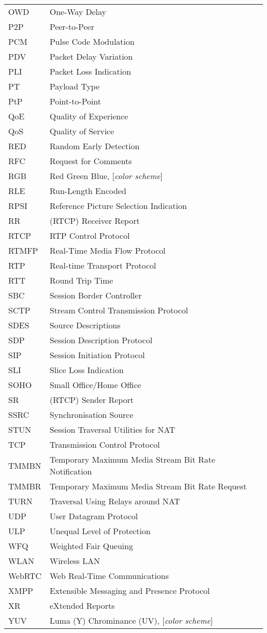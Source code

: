 \begin{longtable}{ll}
OWD 	& One-Way Delay \\
P2P 	& Peer-to-Peer \\
PCM 	& Pulse Code Modulation \\
PDV  	& Packet Delay Variation \\
PLI 	& Packet Loss Indication \\
PT  	& Payload Type \\
PtP 	& Point-to-Point \\
QoE 	& Quality of Experience \\
QoS 	& Quality of Service \\
RED 	& Random Early Detection \\
RFC 	& Request for Comments \\
RGB 	& Red Green Blue, [\textit{color scheme}] \\
RLE  	& Run-Length Encoded \\
RPSI 	& Reference Picture Selection Indication \\
RR  	& (RTCP) Receiver Report \\
RTCP 	& RTP Control Protocol \\
RTMFP	& Real-Time Media Flow Protocol \\
RTP 	& Real-time Transport Protocol \\
RTT 	& Round Trip Time \\
SBC  	& Session Border Controller \\
SCTP 	& Stream Control Transmission Protocol  \\
SDES	& Source Descriptions \\
SDP 	& Session Description Protocol \\
SIP 	& Session Initiation Protocol \\
SLI 	& Slice Loss Indication \\
SOHO 	& Small Office/Home Office \\
SR  	& (RTCP) Sender Report \\
SSRC	& Synchronisation Source \\
STUN  	& Session Traversal Utilities for NAT \\
TCP 	& Transmission Control Protocol \\
TMMBN 	& Temporary Maximum Media Stream Bit Rate Notification \\
TMMBR 	& Temporary Maximum Media Stream Bit Rate Request \\
TURN  	& Traversal Using Relays around NAT \\
UDP 	& User Datagram Protocol \\
ULP 	& Unequal Level of Protection \\
WFQ 	& Weighted Fair Queuing \\
WLAN	& Wireless LAN \\
WebRTC	& Web Real-Time Communications \\
XMPP 	& Extensible Messaging and Presence Protocol \\
XR  	& eXtended Reports \\
YUV 	& Luma (Y) Chrominance (UV), [\textit{color scheme}] \\
\end{longtable}
